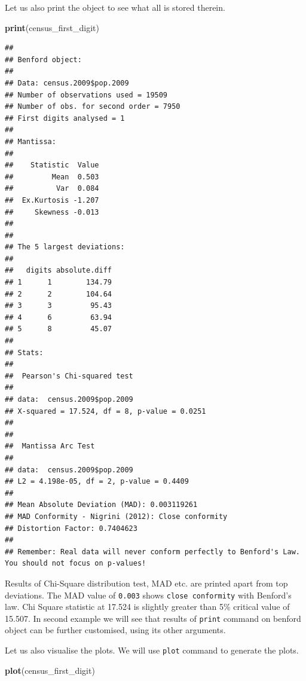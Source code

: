 \documentclass[
]{book}
\newenvironment{Shaded}{\begin{snugshade}}{\end{snugshade}}
\newcommand{\FunctionTok}[1]{\textcolor[rgb]{0.13,0.29,0.53}{\textbf{#1}}}
\newcommand{\NormalTok}[1]{#1}
\begin{document}
Let us also print the object to see what all is stored therein.

\begin{Shaded}
\begin{Highlighting}[]
\FunctionTok{print}\NormalTok{(census\_first\_digit)}
\end{Highlighting}
\end{Shaded}

\begin{verbatim}
## 
## Benford object:
##  
## Data: census.2009$pop.2009 
## Number of observations used = 19509 
## Number of obs. for second order = 7950 
## First digits analysed = 1
## 
## Mantissa: 
## 
##    Statistic  Value
##         Mean  0.503
##          Var  0.084
##  Ex.Kurtosis -1.207
##     Skewness -0.013
## 
## 
## The 5 largest deviations: 
## 
##   digits absolute.diff
## 1      1        134.79
## 2      2        104.64
## 3      3         95.43
## 4      6         63.94
## 5      8         45.07
## 
## Stats:
## 
##  Pearson's Chi-squared test
## 
## data:  census.2009$pop.2009
## X-squared = 17.524, df = 8, p-value = 0.0251
## 
## 
##  Mantissa Arc Test
## 
## data:  census.2009$pop.2009
## L2 = 4.198e-05, df = 2, p-value = 0.4409
## 
## Mean Absolute Deviation (MAD): 0.003119261
## MAD Conformity - Nigrini (2012): Close conformity
## Distortion Factor: 0.7404623
## 
## Remember: Real data will never conform perfectly to Benford's Law. You should not focus on p-values!
\end{verbatim}

Results of Chi-Square distribution test, MAD etc. are printed apart from top deviations. The MAD value of \texttt{0.003} shows \texttt{close\ conformity} with Benford's law. Chi Square statistic at 17.524 is slightly greater than 5\% critical value of 15.507. In second example we will see that results of \texttt{print} command on benford object can be further customised, using its other arguments.

Let us also visualise the plots. We will use \texttt{plot} command to generate the plots.

\begin{Shaded}
\begin{Highlighting}[]
\FunctionTok{plot}\NormalTok{(census\_first\_digit)}
\end{Highlighting}
\end{Shaded}
\end{document}
